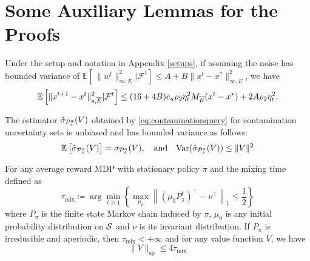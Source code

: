 \section{Some Auxiliary Lemmas for the Proofs}
\begin{lemma} \label{lem:zhanglemma6}
    Under the setup and notation in Appendix \ref{setups}, if assuming the noise has bounded variance of \(\mathbb{E}[\,\|w^t\|_{\infty,\overline{E}}^2 | \mathcal{F}^t] \le A + B\|x^t - x^*\|_{\infty,\overline{E}}^2\), we have
    \begin{equation}
        \mathbb{E}\left[\|x^{t+1}-x^t\|^2_{s,\overline{E}} | \mathcal{F}^t\right] \leq (16+4B)c_u\rho_2\eta_t^2M_{\overline{E}}(x^t-x^*) + 2A\rho_2\eta_t^2.
    \end{equation}
\end{lemma}
\begin{lemma} \label{lem:wangthmD1}
    The estimator $\hat{\sigma}_{\mathcal{P}^a_s}(V)$ obtained by \eqref{eq:contaminationquery} for contamination uncertainty sets is unbiased and has bounded variance as follows:
    \begin{equation}
        \mathbb{E}\left[\hat{\sigma}_{\mathcal{P}^a_s}(V)\right] = {\sigma}_{\mathcal{P}^a_s}(V), \quad \text{and} \quad \mathrm{Var}(\hat{\sigma}_{\mathcal{P}^a_s}(V)) \leq  \|V\|^2
    \end{equation}
\end{lemma}
\begin{lemma} \label{lem:wanglemma9}
    For any average reward MDP with stationary policy $\pi$ and the mixing time defined as 
    \begin{equation} \label{eq:tmix}
    \tau_{\mathrm{mix}}\coloneqq\arg\min_{t \geq 1} \left\{ \max_{\mu_0} \left\| (\mu_0 P_{\pi}^{t})^{\top} - \nu^{\top} \right\|_1 \leq \frac{1}{2} \right\}
    \end{equation}
    where $P_\pi$ is the finite state Markov chain induced by $\pi$, $\mu_0$ is any initial probability distribution on $\mathcal{S}$ and $\nu$ is its invariant distribution. If $P_\pi$ is irreducible and aperiodic, then $ \tau_{\mathrm{mix}} < +\infty$ and for any value function $V$, we have
    \begin{equation}
        \|V\|_{\mathrm{sp}} \leq 4\tau_{\mathrm{mix}}
    \end{equation}
\end{lemma}